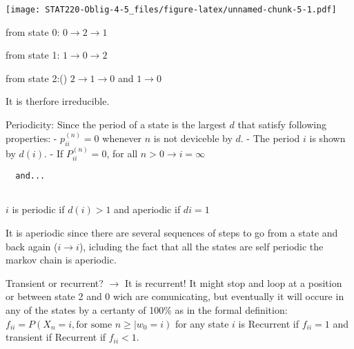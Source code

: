 \documentclass[]{article}
\newenvironment{Shaded}{\begin{snugshade}}{\end{snugshade}}
\newcommand{\DataTypeTok}[1]{\textcolor[rgb]{0.13,0.29,0.53}{#1}}
\newcommand{\DecValTok}[1]{\textcolor[rgb]{0.00,0.00,0.81}{#1}}
\newcommand{\FloatTok}[1]{\textcolor[rgb]{0.00,0.00,0.81}{#1}}
\newcommand{\KeywordTok}[1]{\textcolor[rgb]{0.13,0.29,0.53}{\textbf{#1}}}
\newcommand{\NormalTok}[1]{#1}
\newcommand{\OperatorTok}[1]{\textcolor[rgb]{0.81,0.36,0.00}{\textbf{#1}}}
\newcommand{\OtherTok}[1]{\textcolor[rgb]{0.56,0.35,0.01}{#1}}
\newcommand{\StringTok}[1]{\textcolor[rgb]{0.31,0.60,0.02}{#1}}
\begin{document}
\begin{Shaded}
\end{Shaded}

\texttt{[image: STAT220-Oblig-4-5\_files/figure-latex/unnamed-chunk-5-1.pdf]}

from state 0: \(0\rightarrow 2\rightarrow 1\)

from state 1: \(1\rightarrow 0\rightarrow 2\)

from state 2:() \(2\rightarrow 1\rightarrow 0\) and \(1\rightarrow 0\)

It is therfore irreducible.

Periodicity: Since the period of a state is the largest \(d\) that
satisfy following properties: - \(p_{ii}^{(n)} = 0\) whenever \(n\) is
not deviceble by \(d\). - The period \(i\) is shown by \(d(i)\). - If
\(P_{ii}^{(n)} = 0\), for all \(n>0\rightarrow{i}=\infty\)

\begin{verbatim}
  and...
  
\end{verbatim}

\(i\) is periodic if \(d(i)>1\) and aperiodic if \(di=1\)

It is aperiodic since there are several sequences of steps to go from a
state and back again (\(i\rightarrow i\)), icluding the fact that all
the states are self periodic the markov chain is aperiodic.

Transient or recurrent? \(\rightarrow\) It is recurrent! It might stop
and loop at a position or between state 2 and 0 wich are comunicating,
but eventually it will occure in any of the states by a certanty of
100\% as in the formal definition:
\(f_{ii}=P(X_{n} = i, \textrm{for some } n\geq|w_{0}=i)\) for any state
\(i\) is Recurrent if \(f_{ii}=1\) and transient if Recurrent if
\(f_{ii}<1\).
\end{document}
